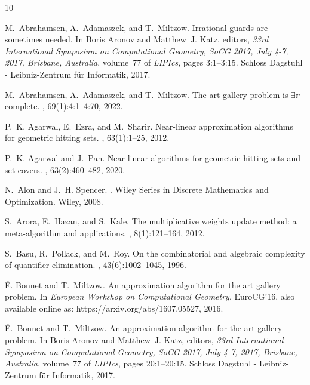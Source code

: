 \documentclass[a4paper,11pt]{article}
\begin{document}
\begin{thebibliography}{10}
	
	M.~Abrahamsen, A.~Adamaszek, and T.~Miltzow.
	\newblock Irrational guards are sometimes needed.
	\newblock In Boris Aronov and Matthew~J. Katz, editors, {\em 33rd International
		Symposium on Computational Geometry, SoCG 2017, July 4-7, 2017, Brisbane,
		Australia}, volume~77 of {\em LIPIcs}, pages 3:1--3:15. Schloss Dagstuhl -
	Leibniz-Zentrum f{\"{u}}r Informatik, 2017.
	
	M.~Abrahamsen, A.~Adamaszek, and T.~Miltzow.
	\newblock The art gallery problem is {\(\exists\)}{\(\mathbb{r}\)}-complete.
	, 69(1):4:1--4:70, 2022.
	
	P.~K. Agarwal, E.~Ezra, and M.~Sharir.
	\newblock Near-linear approximation algorithms for geometric hitting sets.
	, 63(1):1--25, 2012.
	
	P.~K. Agarwal and J.~Pan.
	\newblock Near-linear algorithms for geometric hitting sets and set covers.
	, 63(2):460--482, 2020.
	
	N.~Alon and J.~H. Spencer.
	.
	\newblock Wiley Series in Discrete Mathematics and Optimization. Wiley, 2008.
	
	S.~Arora, E.~Hazan, and S.~Kale.
	\newblock The multiplicative weights update method: a meta-algorithm and
	applications.
	, 8(1):121--164, 2012.
	
	S.~Basu, R.~Pollack, and M.~Roy.
	\newblock On the combinatorial and algebraic complexity of quantifier
	elimination.
	, 43(6):1002--1045, 1996.
	
	\'E. Bonnet and T.~Miltzow.
	\newblock An approximation algorithm for the art gallery problem.
	\newblock In {\em European Workshop on Computational Geometry}, EuroCG'16, also
	available online as: https://arxiv.org/abs/1607.05527, 2016.
	
	{\'{E}}.~Bonnet and T.~Miltzow.
	\newblock An approximation algorithm for the art gallery problem.
	\newblock In Boris Aronov and Matthew~J. Katz, editors, {\em 33rd International
		Symposium on Computational Geometry, SoCG 2017, July 4-7, 2017, Brisbane,
		Australia}, volume~77 of {\em LIPIcs}, pages 20:1--20:15. Schloss Dagstuhl -
	Leibniz-Zentrum f{\"{u}}r Informatik, 2017.
	

\end{thebibliography}
\end{document}
